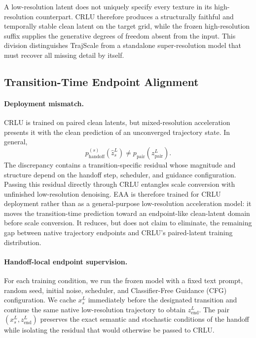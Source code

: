 A low-resolution latent does not uniquely specify every texture in its
high-resolution counterpart. CRLU therefore produces a structurally faithful
and temporally stable clean latent on the target grid, while the frozen
high-resolution suffix supplies the generative degrees of freedom absent from
the input. This division distinguishes TrajScale from a standalone
super-resolution model that must recover all missing detail by itself.

\subsection{Transition-Time Endpoint Alignment}
\label{sec:eaa}

\paragraph{Deployment mismatch.}
CRLU is trained on paired clean latents, but mixed-resolution acceleration
presents it with the clean prediction of an unconverged trajectory state. In
general,
\[
p_{\mathrm{handoff}}^{(s)}(\widehat z_s^L)
\neq
p_{\mathrm{pair}}(z_{\mathrm{pair}}^L).
\]
The discrepancy contains a transition-specific residual whose magnitude and
structure depend on the handoff step, scheduler, and guidance configuration.
Passing this residual directly through CRLU entangles scale conversion with
unfinished low-resolution denoising. EAA is therefore trained for CRLU
deployment rather than as a general-purpose low-resolution acceleration model:
it moves the transition-time prediction toward an endpoint-like clean-latent
domain before scale conversion. It reduces, but does not claim to eliminate,
the remaining gap between native trajectory endpoints and CRLU's paired-latent
training distribution.

\paragraph{Handoff-local endpoint supervision.}
For each training condition, we run the frozen model with a fixed text prompt,
random seed, initial noise, scheduler, and Classifier-Free Guidance (CFG)
configuration. We cache \(x_s^L\) immediately before the designated transition
and continue the same native low-resolution trajectory to obtain
\(z_{\mathrm{end}}^L\). The pair
\((x_s^L,z_{\mathrm{end}}^L)\) preserves the exact semantic and stochastic
conditions of the handoff while isolating the residual that would otherwise be
passed to CRLU.

